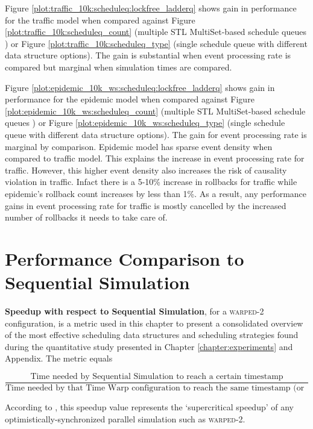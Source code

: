\documentclass[11pt]{book}
\begin{document}
Figure \ref{plot:traffic_10k:scheduleq:lockfree_ladderq} shows gain in performance for the traffic model when
compared against Figure \ref{plot:traffic_10k:scheduleq_count} (multiple STL MultiSet-based schedule queues )
or Figure \ref{plot:traffic_10k:scheduleq_type} (single schedule queue with different data structure options).
The gain is substantial when event processing rate is compared but marginal when simulation times are compared.

Figure \ref{plot:epidemic_10k_ws:scheduleq:lockfree_ladderq} shows gain in performance for the epidemic model
when compared against Figure \ref{plot:epidemic_10k_ws:scheduleq_count} (multiple STL MultiSet-based schedule
queues ) or Figure \ref{plot:epidemic_10k_ws:scheduleq_type} (single schedule queue with different data structure
options). The gain for event processing rate is marginal by comparison. Epidemic model has sparse event density
when compared to traffic model. This explains the increase in event processing rate for traffic. However, this
higher event density also increases the risk of causality violation in traffic. Infact there is a 5-10\%
increase in rollbacks for traffic while epidemic's rollback count increases by less than 1\%. As a result, any
performance gains in event processing rate for traffic is mostly cancelled by the increased number of rollbacks
it needs to take care of.


\chapter[Performance vs. Sequential]{Performance Comparison to Sequential Simulation}
\label{chapter:comparison_to_sequential}

\textbf{Speedup with respect to Sequential Simulation}, for a \textsc{warped-2} configuration, is a metric
used in this chapter to present a consolidated overview of the most effective scheduling data structures and
scheduling strategies found during the quantitative study presented in Chapter \ref{chapter:experiments} and
Appendix. The metric equals

\begin{equation*}
    \frac{\text{Time needed by Sequential Simulation to reach a certain timestamp}} {\text{Time needed by that
    Time Warp configuration to reach the same timestamp (or GVT)}}
\end{equation*}

\noindent
According to \cite{jefferson-91}, this speedup value represents the `supercritical speedup' of any
optimistically-synchronized parallel simulation such as \textsc{warped-2}.
\end{document}
